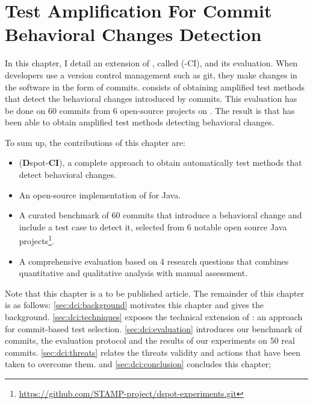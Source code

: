 \chapter{Test Amplification For Commit Behavioral Changes Detection}
\label{chap:dci}


\begin{chaptersummary}
	In this chapter, I detail an extension of \dspot, called \DCI(\dspot-CI), and its evaluation.
	When developers use a version control management such as git, they make changes in the software in the form of commits.
	\DCI consists of obtaining amplified test methods that detect the behavioral changes introduced by commits.
	This evaluation has be done on 60 commits from 6 open-source projects on \gh.
	The result is that \DCI has been able to obtain amplified test methods detecting  behavioral changes.
	
	To sum up, the contributions of this chapter are:
	\begin{itemize}
		\item \DCI (\textbf{D}spot-\textbf{CI}), a complete approach to obtain automatically test methods that detect behavioral changes.
		\item An open-source implementation of \DCI for Java.
		\item A curated benchmark of 60 commits that introduce a behavioral change and include a test case to detect it, selected from 6 notable open source Java projects\footnote{\url{https://github.com/STAMP-project/dspot-experiments.git}}.
		\item A comprehensive evaluation based on 4 research questions that combines quantitative and qualitative analysis with manual assessment.
	\end{itemize}
	Note that this chapter is a to be published article\cite{DBLP:journals/corr/abs-1902-08482}.
	The remainder of this chapter is as follows:
	\autoref{sec:dci:background} motivates this chapter and gives the background.
	\autoref{sec:dci:techniques} exposes the technical extension of \dspot: an approach for commit-based test selection. 
	\autoref{sec:dci:evaluation} introduces our benchmark of commits, the evaluation protocol and the results of our experiments on 50 real commits. 
	\autoref{sec:dci:threats} relates the threats validity and actions that have been taken to overcome them. 
	and \autoref{sec:dci:conclusion} concludes this chapter;
\end{chaptersummary}

\graphicspath{{.}{chapitres/behavioral-change-detection-for-commit/}}

